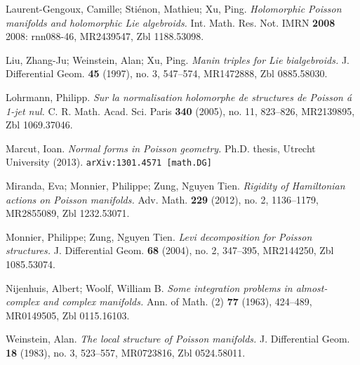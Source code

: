 \begin{thebibliography}{9}
Laurent-Gengoux, Camille; Stiénon, Mathieu; Xu, Ping. \emph{Holomorphic Poisson manifolds and holomorphic Lie algebroids.} Int. Math. Res. Not. IMRN \textbf{2008} 2008: rnn088-46, MR2439547, Zbl 1188.53098.

Liu, Zhang-Ju; Weinstein, Alan; Xu, Ping. \emph{Manin triples for Lie bialgebroids.} J. Differential Geom. \textbf{45} (1997), no. 3, 547--574, MR1472888, Zbl 0885.58030.

Lohrmann, Philipp. \emph{Sur la normalisation holomorphe de structures de Poisson \'a 1-jet nul.} C. R. Math. Acad. Sci. Paris \textbf{340} (2005), no. 11, 823--826, MR2139895, Zbl 1069.37046.

Marcut, Ioan. \emph{Normal forms in Poisson geometry.} Ph.D. thesis, Utrecht University (2013).  {\tt arXiv:1301.4571 [math.DG]}

Miranda, Eva; Monnier, Philippe; Zung, Nguyen Tien. \emph{Rigidity of Hamiltonian actions on Poisson manifolds.} Adv. Math. \textbf{229} (2012), no. 2, 1136--1179, MR2855089, Zbl 1232.53071.

Monnier, Philippe; Zung, Nguyen Tien. \emph{Levi decomposition for Poisson structures.} J. Differential Geom. \textbf{68} (2004), no. 2, 347--395, MR2144250, Zbl 1085.53074.

Nijenhuis, Albert; Woolf, William B. \emph{Some integration problems in almost-complex and complex manifolds.} Ann. of Math. (2) \textbf{77} (1963), 424--489, MR0149505, Zbl 0115.16103.

Weinstein, Alan. \emph{The local structure of Poisson manifolds.} J. Differential Geom. \textbf{18} (1983), no. 3, 523--557, MR0723816, Zbl 0524.58011.
\end{thebibliography}
